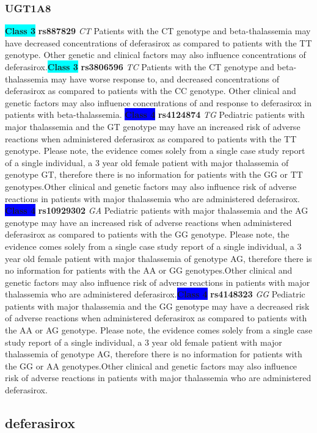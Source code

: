 \documentclass{book}
\begin{document}
\subsubsection{ UGT1A8 }

\begin{center}
\textbf{\colorbox{cyan} {Class 3}} \textbf{ rs887829 } \textit{ CT }
Patients with the CT genotype and beta-thalassemia may have decreased concentrations of deferasirox as compared to patients with the TT genotype. Other genetic and clinical factors may also influence concentrations of deferasirox.\textbf{\colorbox{cyan} {Class 3}} \textbf{ rs3806596 } \textit{ TC }
Patients with the CT genotype and beta-thalassemia may have worse response to, and decreased concentrations of deferasirox as compared to patients with the CC genotype. Other clinical and genetic factors may also influence concentrations of and response to deferasirox in patients with beta-thalassemia.
\textbf{\colorbox{blue} {Class 4}} \textbf{ rs4124874 } \textit{ TG }
Pediatric patients with major thalassemia and the GT genotype may have an increased risk of adverse reactions when administered deferasirox as compared to patients with the TT genotype. Please note, the evidence comes solely from a single case study report of a single individual, a 3 year old female patient with major thalassemia of genotype GT, therefore there is no information for patients with the GG or TT genotypes.Other clinical and genetic factors may also influence risk of adverse reactions in patients with major thalassemia who are administered deferasirox. \textbf{\colorbox{blue} {Class 4}} \textbf{ rs10929302 } \textit{ GA }
Pediatric patients with major thalassemia and the AG genotype may have an increased risk of adverse reactions when administered deferasirox as compared to patients with the GG genotype. Please note, the evidence comes solely from a single case study report of a single individual, a 3 year old female patient with major thalassemia of genotype AG, therefore there is no information for patients with the AA or GG genotypes.Other clinical and genetic factors may also influence risk of adverse reactions in patients with major thalassemia who are administered deferasirox.\textbf{\colorbox{blue} {Class 4}} \textbf{ rs4148323 } \textit{ GG }
Pediatric patients with major thalassemia and the GG genotype may have a decreased risk of adverse reactions when administered deferasirox as compared to patients with the AA or AG genotype. Please note, the evidence comes solely from a single case study report of a single individual, a 3 year old female patient with major thalassemia of genotype AG, therefore there is no information for patients with the GG or AA genotypes.Other clinical and genetic factors may also influence risk of adverse reactions in patients with major thalassemia who are administered deferasirox.

\end{center}\subsection{ deferasirox }
\end{document}
